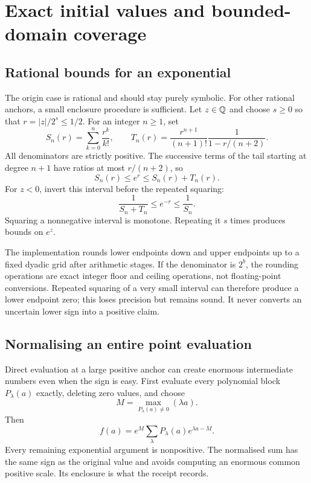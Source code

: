 \section{Exact initial values and bounded-domain coverage}
\label{sec:enclosures}

\subsection{Rational bounds for an exponential}

The origin case is rational and should stay purely symbolic. For other rational
anchors, a small enclosure procedure is sufficient. Let $z\in\mathbb Q$ and choose
$s\ge0$ so that $r=|z|/2^s\le1/2$. For an integer $n\ge1$, set
\[
 S_n(r)=\sum_{k=0}^{n}\frac{r^k}{k!},\qquad
 T_n(r)=\frac{r^{n+1}}{(n+1)!}
             \frac{1}{1-r/(n+2)}.
\]
All denominators are strictly positive. The successive terms of the tail
starting at degree $n+1$ have ratios at most $r/(n+2)$, so
\begin{equation}
 S_n(r)\le e^r\le S_n(r)+T_n(r).
 \label{eq:exp-bounds}
\end{equation}
For $z<0$, invert this interval before the repeated squaring:
\[
 \frac{1}{S_n+T_n}\le e^{-r}\le\frac{1}{S_n}.
\]
Squaring a nonnegative interval is monotone. Repeating it $s$ times produces
bounds on $e^z$.

The implementation rounds lower endpoints down and upper endpoints up to a
fixed dyadic grid after arithmetic stages. If the denominator is $2^b$, the
rounding operations are exact integer floor and ceiling operations, not
floating-point conversions. Repeated squaring of a very small interval can
therefore produce a lower endpoint zero; this loses precision but remains
sound. It never converts an uncertain lower sign into a positive claim.

\subsection{Normalising an entire point evaluation}

Direct evaluation at a large positive anchor can create enormous intermediate
numbers even when the sign is easy. First evaluate every polynomial block
$P_\lambda(a)$ exactly, deleting zero values, and choose
\[
 M=\max_{P_\lambda(a)\ne0}(\lambda a).
\]
Then
\begin{equation}
 f(a)=e^M\sum_\lambda P_\lambda(a)e^{\lambda a-M}.
 \label{eq:normalised-evaluation}
\end{equation}
Every remaining exponential argument is nonpositive. The normalised sum has
the same sign as the original value and avoids computing an enormous common
positive scale. Its enclosure is what the receipt records.

